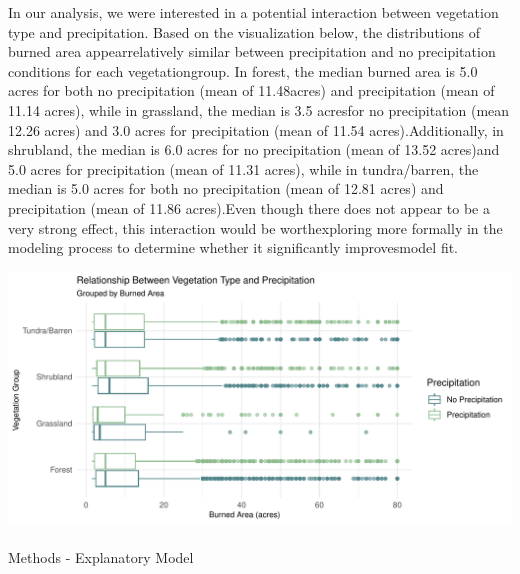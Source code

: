 \documentclass[
  letterpaper,
  DIV=11,
  numbers=noendperiod]{scrartcl}
\makeatletter
\let\oldparagraph\paragraph
\renewcommand{\paragraph}{
    \@ifstar
      \xxxParagraphStar
      \xxxParagraphNoStar
  }
\newcommand{\xxxParagraphStar}[1]{\oldparagraph*{#1}\mbox{}}
\newcommand{\xxxParagraphNoStar}[1]{\oldparagraph{#1}\mbox{}}
\makeatother
\begin{document}
In our analysis, we were interested in a potential interaction between
vegetation type and precipitation. Based on the visualization below, the
distributions of burned area appearrelatively similar between
precipitation and no precipitation conditions for each vegetationgroup.
In forest, the median burned area is 5.0 acres for both no precipitation
(mean of 11.48acres) and precipitation (mean of 11.14 acres), while in
grassland, the median is 3.5 acresfor no precipitation (mean 12.26
acres) and 3.0 acres for precipitation (mean of 11.54
acres).Additionally, in shrubland, the median is 6.0 acres for no
precipitation (mean of 13.52 acres)and 5.0 acres for precipitation (mean
of 11.31 acres), while in tundra/barren, the median is 5.0 acres for
both no precipitation (mean of 12.81 acres) and precipitation (mean of
11.86 acres).Even though there does not appear to be a very strong
effect, this interaction would be worthexploring more formally in the
modeling process to determine whether it significantly improvesmodel
fit.

\includegraphics{written-report_files/figure-pdf/veg-prec-int-1.pdf}

\paragraph{Methods - Explanatory
Model}\label{methods---explanatory-model}
\end{document}
